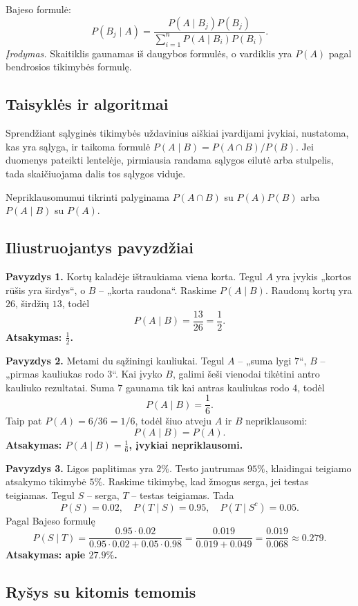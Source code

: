\begin{teorema}
Bajeso formulė:
\[
P(B_j\mid A)=\frac{P(A\mid B_j)P(B_j)}{\sum_{i=1}^nP(A\mid B_i)P(B_i)}.
\]
\emph{Įrodymas.} Skaitiklis gaunamas iš daugybos formulės, o vardiklis yra $P(A)$ pagal bendrosios tikimybės formulę.
\end{teorema}

\subsection{Taisyklės ir algoritmai}

Sprendžiant sąlyginės tikimybės uždavinius aiškiai įvardijami įvykiai, nustatoma, kas yra sąlyga, ir taikoma formulė $P(A\mid B)=P(A\cap B)/P(B)$. Jei duomenys pateikti lentelėje, pirmiausia randama sąlygos eilutė arba stulpelis, tada skaičiuojama dalis tos sąlygos viduje.

Nepriklausomumui tikrinti palyginama $P(A\cap B)$ su $P(A)P(B)$ arba $P(A\mid B)$ su $P(A)$.

\subsection{Iliustruojantys pavyzdžiai}

\textbf{Pavyzdys 1.} Kortų kaladėje ištraukiama viena korta. Tegul $A$ yra įvykis „kortos rūšis yra širdys“, o $B$ -- „korta raudona“. Raskime $P(A\mid B)$. Raudonų kortų yra $26$, širdžių $13$, todėl
\[
P(A\mid B)=\frac{13}{26}=\frac12.
\]
\textbf{Atsakymas: $\frac12$.}

\textbf{Pavyzdys 2.} Metami du sąžiningi kauliukai. Tegul $A$ -- „suma lygi $7$“, $B$ -- „pirmas kauliukas rodo $3$“. Kai įvyko $B$, galimi šeši vienodai tikėtini antro kauliuko rezultatai. Suma $7$ gaunama tik kai antras kauliukas rodo $4$, todėl
\[
P(A\mid B)=\frac16.
\]
Taip pat $P(A)=6/36=1/6$, todėl šiuo atveju $A$ ir $B$ nepriklausomi:
\[
P(A\mid B)=P(A).
\]
\textbf{Atsakymas: $P(A\mid B)=\frac16$, įvykiai nepriklausomi.}

\textbf{Pavyzdys 3.} Ligos paplitimas yra $2\%$. Testo jautrumas $95\%$, klaidingai teigiamo atsakymo tikimybė $5\%$. Raskime tikimybę, kad žmogus serga, jei testas teigiamas. Tegul $S$ -- serga, $T$ -- testas teigiamas. Tada
\[
P(S)=0.02,\quad P(T\mid S)=0.95,\quad P(T\mid S^c)=0.05.
\]
Pagal Bajeso formulę
\[
P(S\mid T)=\frac{0.95\cdot0.02}{0.95\cdot0.02+0.05\cdot0.98}
=\frac{0.019}{0.019+0.049}
=\frac{0.019}{0.068}\approx0.279.
\]
\textbf{Atsakymas: apie $27.9\%$.}

\subsection{Ryšys su kitomis temomis}

